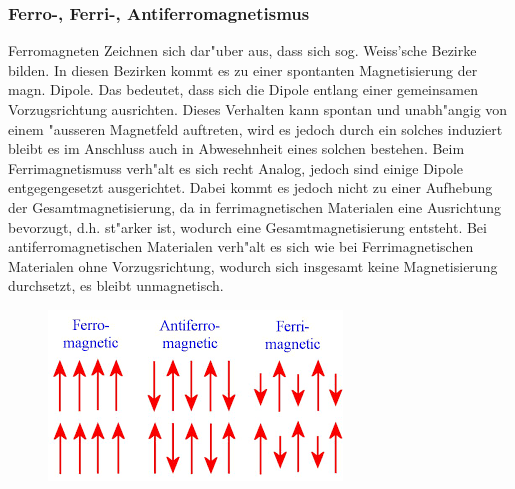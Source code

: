         \subsubsection*{Ferro-, Ferri-, Antiferromagnetismus}
            Ferromagneten Zeichnen sich dar"uber aus, dass sich sog. Weiss'sche Bezirke bilden. In diesen Bezirken
            kommt es zu einer spontanten Magnetisierung der magn. Dipole. Das bedeutet, dass sich die Dipole entlang einer
            gemeinsamen Vorzugsrichtung ausrichten. Dieses Verhalten kann spontan und unabh"angig von einem "ausseren Magnetfeld
            auftreten, wird es jedoch durch ein solches induziert bleibt es im Anschluss auch in Abwesehnheit eines solchen bestehen.
            Beim Ferrimagnetismuss verh"alt es sich recht Analog, jedoch sind einige Dipole entgegengesetzt ausgerichtet.
            Dabei kommt es jedoch nicht zu einer Aufhebung der Gesamtmagnetisierung, da in ferrimagnetischen Materialen
            eine Ausrichtung bevorzugt, d.h. st"arker ist, wodurch eine Gesamtmagnetisierung entsteht.
            Bei antiferromagnetischen Materialen verh"alt es sich wie bei Ferrimagnetischen Materialen ohne Vorzugsrichtung,
            wodurch sich insgesamt keine Magnetisierung durchsetzt, es bleibt unmagnetisch.
            \begin{figure}[H]
                \centering
                \includegraphics{Images/ferroferrianti.png}
            \end{figure}
